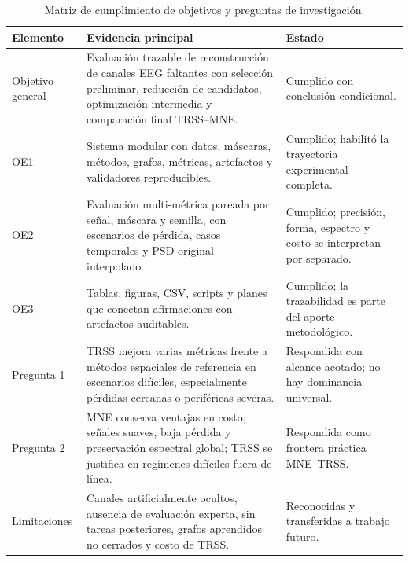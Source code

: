 \begin{table}[htbp]
\centering
\small
\caption{Matriz de cumplimiento de objetivos y preguntas de investigación.}
\label{tab:ch8_objective_evidence}
\begin{tabular}{@{}p{2.35cm}p{5.55cm}p{3.6cm}@{}}
\toprule
Elemento & Evidencia principal & Estado \\
\midrule
Objetivo general & Evaluación trazable de reconstrucción de canales EEG faltantes con selección preliminar, reducción de candidatos, optimización intermedia y comparación final TRSS--MNE. & Cumplido con conclusión condicional. \\
OE1 & Sistema modular con datos, máscaras, métodos, grafos, métricas, artefactos y validadores reproducibles. & Cumplido; habilitó la trayectoria experimental completa. \\
OE2 & Evaluación multi-métrica pareada por señal, máscara y semilla, con escenarios de pérdida, casos temporales y PSD original--interpolado. & Cumplido; precisión, forma, espectro y costo se interpretan por separado. \\
OE3 & Tablas, figuras, CSV, scripts y planes que conectan afirmaciones con artefactos auditables. & Cumplido; la trazabilidad es parte del aporte metodológico. \\
Pregunta 1 & TRSS mejora varias métricas frente a métodos espaciales de referencia en escenarios difíciles, especialmente pérdidas cercanas o periféricas severas. & Respondida con alcance acotado; no hay dominancia universal. \\
Pregunta 2 & MNE conserva ventajas en costo, señales suaves, baja pérdida y preservación espectral global; TRSS se justifica en regímenes difíciles fuera de línea. & Respondida como frontera práctica MNE--TRSS. \\
Limitaciones & Canales artificialmente ocultos, ausencia de evaluación experta, sin tareas posteriores, grafos aprendidos no cerrados y costo de TRSS. & Reconocidas y transferidas a trabajo futuro. \\
\bottomrule
\end{tabular}
\end{table}
